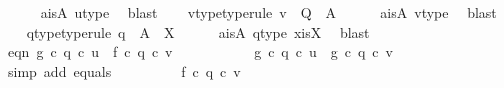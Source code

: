 \begin{isabellebody}
\ \ \ \ \isamarkupfalse%
\ a{\isacharunderscore}{\kern0pt}is{\isacharunderscore}{\kern0pt}A\ u{\isacharunderscore}{\kern0pt}type\ \isamarkupfalse%
\ blast\isanewline
\ \ \isamarkupfalse%
\ v{\isacharunderscore}{\kern0pt}type{}{\isacharbrackleft}{\kern0pt}type{\isacharunderscore}{\kern0pt}rule{\isacharbrackright}{\kern0pt}{\isacharcolon}{\kern0pt}\ {\isachardoublequoteopen}v\ {\isacharcolon}{\kern0pt}\ Q\ {\isasymrightarrow}\ A{\isachardoublequoteclose}\isanewline
\ \ \ \ \isamarkupfalse%
\ a{\isacharunderscore}{\kern0pt}is{\isacharunderscore}{\kern0pt}A\ v{\isacharunderscore}{\kern0pt}type\ \isamarkupfalse%
\ blast\isanewline
\ \ \isamarkupfalse%
\ q{}{\isacharunderscore}{\kern0pt}type{}{\isacharbrackleft}{\kern0pt}type{\isacharunderscore}{\kern0pt}rule{\isacharbrackright}{\kern0pt}{\isacharcolon}{\kern0pt}\ {\isachardoublequoteopen}q{}\ {\isacharcolon}{\kern0pt}\ A\ {\isasymrightarrow}\ X{\isachardoublequoteclose}\isanewline
\ \ \ \ \isamarkupfalse%
\ a{\isacharunderscore}{\kern0pt}is{\isacharunderscore}{\kern0pt}A\ q{}{\isacharunderscore}{\kern0pt}type\ x{\isacharunderscore}{\kern0pt}is{\isacharunderscore}{\kern0pt}X\ \isamarkupfalse%
\ blast\isanewline
\isanewline
\ \ \isamarkupfalse%
\ eqn{}{\isacharcolon}{\kern0pt}\ {\isachardoublequoteopen}g\ {\isasymcirc}\isactrlsub c\ {\isacharparenleft}{\kern0pt}q{}\ {\isasymcirc}\isactrlsub c\ u{\isacharparenright}{\kern0pt}\ {\isacharequal}{\kern0pt}\ f\ {\isasymcirc}\isactrlsub c\ {\isacharparenleft}{\kern0pt}q{}\ {\isasymcirc}\isactrlsub c\ v{\isacharparenright}{\kern0pt}{\isachardoublequoteclose}\isanewline
\ \ \isamarkupfalse%
\ {\isacharminus}{\kern0pt}\ \isanewline
\ \ \ \ \isamarkupfalse%
\ {\isachardoublequoteopen}g\ {\isasymcirc}\isactrlsub c\ {\isacharparenleft}{\kern0pt}q{}\ {\isasymcirc}\isactrlsub c\ u{\isacharparenright}{\kern0pt}\ {\isacharequal}{\kern0pt}\ g\ {\isasymcirc}\isactrlsub c\ q{}\ {\isasymcirc}\isactrlsub c\ v{\isachardoublequoteclose}\isanewline
\ \ \ \ \ \ \isamarkupfalse%
\ {\isacharparenleft}{\kern0pt}simp\ add{\isacharcolon}{\kern0pt}\ equals{\isacharparenright}{\kern0pt}\isanewline
\ \ \ \ \isamarkupfalse%
\ \isamarkupfalse%
\ {\isachardoublequoteopen}{\isachardot}{\kern0pt}{\isachardot}{\kern0pt}{\isachardot}{\kern0pt}\ {\isacharequal}{\kern0pt}\ f\ {\isasymcirc}\isactrlsub c\ {\isacharparenleft}{\kern0pt}q{}\ {\isasymcirc}\isactrlsub c\ v{\isacharparenright}{\kern0pt}{\isachardoublequoteclose}\isanewline

\end{isabellebody}
